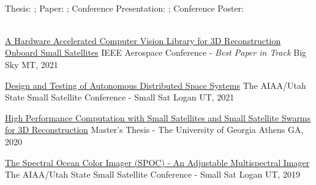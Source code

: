 \documentclass[10pt,a4paper]{article}
\begin{document}
\spacedhrule{0.5em}{-0.4em}
\vspace{-0.2em}
~\\
\centerline{
Thesis: {\color{bluegreen} \faFileTextO} ; \hspace{2mm} Paper: {\color{bluegreen} \faStickyNoteO} ; \hspace{2mm}
Conference Presentation: {\color{bluegreen} \faTelevision} ; \hspace{2mm} Conference Poster: {\color{bluegreen} \faMapO}
}
\\

\headedsection
  {{\color{bluegreen} \faStickyNoteO} \href{https://ieeexplore.ieee.org/abstract/document/9438159}{A Hardware Accelerated Computer Vision Library for 3D Reconstruction Onboard Small Satellites}}{%
  \headedsubsection
    {IEEE Aerospace Conference - \textit{Best Paper in Track}}
    {Big Sky MT, 2021}
    {}
}

\headedsection
  {{\color{bluegreen} \faStickyNoteO} \href{https://digitalcommons.usu.edu/cgi/viewcontent.cgi?article=5003&context=smallsat}{Design and Testing of Autonomous Distributed Space Systems}}{%
  \headedsubsection
    {The AIAA/Utah State Small Satellite Conference - Small Sat}
    {Logan UT, 2021}
    {}
}

\headedsection
  {{\color{bluegreen} \faFileTextO} \href{http://piepieninja.github.io/research-papers/thesis-pre-release.pdf}{High Performance Computation with Small Satellites and Small Satellite Swarms for 3D Reconstruction}}{%
  \headedsubsection
    {Master's Thesis - The University of Georgia}
    {Athens GA, 2020}
    {}
}

\headedsection
  {{\color{bluegreen} \faStickyNoteO} \href{http://smallsat.uga.edu/images/documents/papers/david_smallsat_2019_paper.pdf}{The Spectral Ocean Color Imager (SPOC) - An Adjustable Multispectral Imager}}{%
  \headedsubsection
    {The AIAA/Utah State Small Satellite Conference - Small Sat}
    {Logan UT, 2019}
    {}
}
\end{document}
